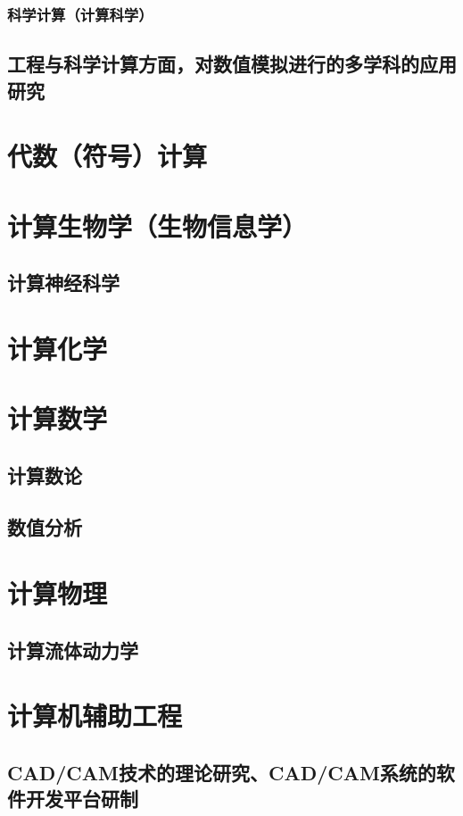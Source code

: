 \documentclass[UTF8]{../computerUniverse}
\begin{document}
\subsection{科学计算（计算科学）}
\section{工程与科学计算方面，对数值模拟进行的多学科的应用研究}

\chapter{代数（符号）计算}
\chapter{计算生物学（生物信息学）}
\section{计算神经科学}

\chapter{计算化学}

\chapter{计算数学}
\section{计算数论}
\section{数值分析}

\chapter{计算物理}
\section{计算流体动力学}



\chapter{计算机辅助工程}
\section{CAD/CAM技术的理论研究、CAD/CAM系统的软件开发平台研制}
\end{document}
